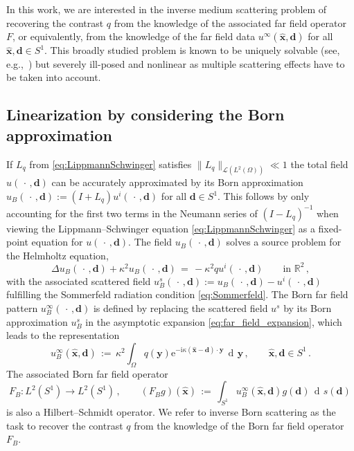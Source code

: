 \documentclass[11pt,a4paper]{article}
\theoremstyle{definition}
\theoremstyle{remark} \newtheorem{remark}[theorem]{Remark}
\numberwithin{equation}{section}
\numberwithin{figure}{section}
\numberwithin{algorithm}{section}
\numberwithin{table}{section}
\newcommand{\field}[1]{{\mathbb{#1}}}
\newcommand{\R}{\field{R}}
\newcommand{\bs}{\boldsymbol}
\newcommand{\bfd}{{\bs d}}
\newcommand{\bfx}{{\bs x}}
\newcommand{\bfy}{{\bs y}}
\newcommand{\xhat}{\widehat{\bfx}}
\newcommand{\ds}{\, \dif s}
\newcommand{\dy}{\, \dif \bfy}
\newcommand{\idir}{\bfd}
\newcommand{\rmi}{\mathrm{i}}
\newcommand{\rme}{\mathrm{e}}
\newcommand{\ph}{\,\cdot\,}
\newcommand{\uinfty}{u^\infty}
\newcommand{\Sone}{{S^1}}
\newcommand{\ui}{u^i}
\newcommand{\Ltwo}{{L^2}}
\DeclareMathOperator{\dif}{d\!}
\begin{document}
In this work, we are interested in the inverse medium scattering problem of recovering the contrast $q$ from the knowledge of the associated far field operator $F$, or equivalently, from the knowledge of the far field data $\uinfty(\xhat,\idir)$ for all $\xhat,\idir\in\Sone$.
This broadly studied problem is known to be uniquely solvable (see, e.g.,~\cite[Thm.~7.28]{Kir21}) but severely ill-posed and nonlinear as multiple scattering effects have to be taken into account.

\subsection{Linearization by considering the Born approximation}
\label{subsec:BornAxpproximation}

If $L_q$ from \eqref{eq:LippmannSchwinger} satisfies %
$\|L_q\|_{\mathscr{L}(\Ltwo(\Omega))}\ll1$
the total field $u(\ph,\idir)$ can be accurately approximated by its Born approximation $u_B(\ph,\idir):= (I+L_q)\ui(\ph,\idir)$ for all $\idir\in\Sone$.
This follows by only accounting for the first two terms in the Neumann series of $(I - L_q)^{-1}$ when viewing the Lippmann--Schwinger equation \eqref{eq:LippmannSchwinger} as a fixed-point equation for $u(\ph,\idir)$.
The field $u_B(\ph,\idir)$ solves a source problem for the Helmholtz equation,
\begin{equation*}
	\Delta u_B(\ph,\idir) + \kappa^2u_B(\ph,\idir) \,=\, -\kappa^2 q\ui(\ph,\idir)\qquad \text{in } \R^2\,,
\end{equation*}
with the associated scattered field $u^s_B(\ph,\idir):=u_B(\ph,\idir)-\ui(\ph,\idir)$ fulfilling the Sommerfeld radiation condition \eqref{eq:Sommerfeld}.
The Born far field pattern $u_B^\infty(\ph,\idir)$ is defined by replacing the scattered field $u^s$ by its Born approximation $u^s_B$ in the asymptotic expansion \eqref{eq:far_field_expansion}, which leads to the representation
\begin{equation}
\label{eq:BornFF}
	u_B^\infty(\xhat,\idir) \,:=\, \kappa^2 \int_{\Omega} q(\bfy)\rme^{-\rmi \kappa (\xhat-\idir)\cdot\bfy}\dy\,, \qquad \xhat,\idir\in\Sone\,.
\end{equation}
The associated Born far field operator
\begin{equation}
\label{eq:BornffO}
	F_B:L^2(\Sone) \rightarrow L^2(\Sone)\,, \qquad
	(F_Bg)(\xhat) \,:=\, \int_{\Sone} u_B^\infty(\xhat,\idir) g(\idir) \ds (\idir)\,
\end{equation}
is also a Hilbert--Schmidt operator. We refer to inverse Born scattering as the task to recover the contrast $q$ from the knowledge of the Born far field operator $F_B$.
\end{document}
